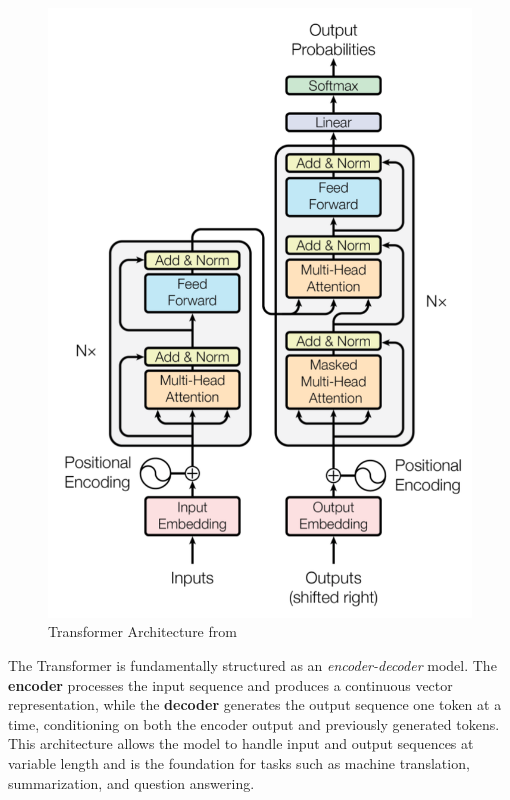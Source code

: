 \begin{figure}[H]
    \centering
    \centering
    \includegraphics[width=0.45\linewidth]{Images/Transformer_architecture3.png}
    \caption{Transformer Architecture from~\cite{vaswani2017attention}}\label{fig:Tranformer}
\end{figure}

The Transformer is fundamentally structured as an \textit{encoder-decoder} model. The \textbf{encoder} processes the input sequence and produces a continuous vector representation, while the \textbf{decoder} generates the output sequence one token at a time, conditioning on both the encoder output and previously generated tokens. This architecture allows the model to handle input and output sequences at variable length and is the foundation for tasks such as machine translation, summarization, and question answering.

